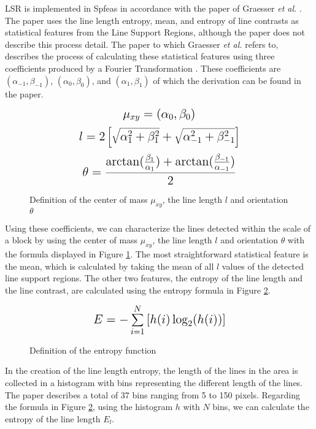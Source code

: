 LSR is implemented in Spfeas in accordance with the paper of Graesser \textit{et al.} \cite{graesser2012image}. The paper uses the line length entropy, mean, and entropy of line contrasts as statistical features from the Line Support Regions, although the paper does not describe this process detail. The paper to which Graesser \textit{et al.} refers to, describes the process of calculating these statistical features using three coefficients produced by a Fourier Transformation \cite{unsalan2004classifying}. These coefficients are $(\alpha_{-1}, \beta_{-1})$, $(\alpha_{0}, \beta_{0})$, and $(\alpha_{1}, \beta_{1})$ of which the derivation can be found in the paper.

\begin{figure}[h]
    \centering
    $$\mathlarger{\mathlarger{ \mu_{xy} = (\alpha_{0}, \beta_{0}) }}$$
    $$\mathlarger{\mathlarger{ l = 2\left[\sqrt{\alpha_{1}^2 + \beta_{1}^2} + \sqrt{\alpha_{-1}^2 + \beta_{-1}^2}\right] }}$$
    $$\mathlarger{\mathlarger{ \theta = \frac{\arctan(\frac{\beta_{1}}{\alpha_{1}}) + \arctan(\frac{\beta_{-1}}{\alpha_{-1}})}{2} }}$$
    \caption{Definition of the center of mass $\mu_{xy}$, the line length $l$ and orientation $\theta$}
    \label{line_def}
\end{figure}

Using these coefficients, we can characterize the lines detected within the scale of a block by using the center of mass $\mu_{xy}$, the line length $l$ and orientation $\theta$ with the formula displayed in Figure \ref{line_def}. The most straightforward statistical feature is the mean, which is calculated by taking the mean of all $l$ values of the detected line support regions. The other two features, the entropy of the line length and the line contrast,  are calculated using the entropy formula in Figure \ref{line_entropy_def}. 

\begin{figure}[h]
    
    $$ \mathlarger{\mathlarger{ E = -\sum_{i=1}^{N} \left[ h(i) \log_2(h(i))\right] }}$$
    \caption{Definition of the entropy function}
    \label{line_entropy_def}
\end{figure}

In the creation of the line length entropy, the length of the lines in the area is collected in a histogram with bins representing the different length of the lines. The paper\cite{unsalan2004classifying} describes a total of 37 bins ranging from 5 to 150 pixels. Regarding the formula in Figure \ref{line_entropy_def}, using the histogram $h$ with $N$ bins, we can calculate the entropy of the line length $E_l$.

